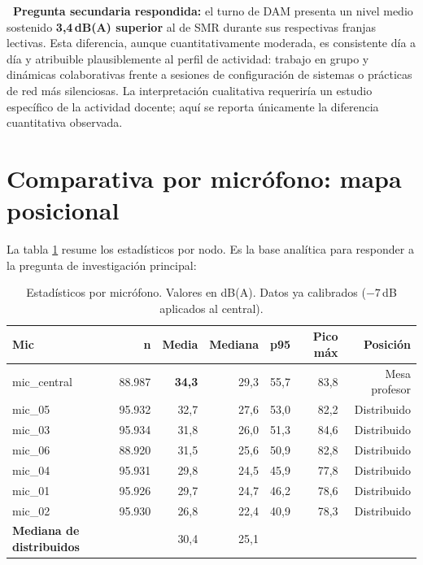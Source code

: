 \documentclass[11pt,a4paper,openany]{report}
\begin{document}
\begin{KeyFinding}
\textbf{\faLightbulb\ Pregunta secundaria respondida:} el turno de DAM presenta un nivel medio sostenido \textbf{3,4\,dB(A) superior} al de SMR durante sus respectivas franjas lectivas. Esta diferencia, aunque cuantitativamente moderada, es consistente d\'ia a d\'ia y atribuible plausiblemente al perfil de actividad: trabajo en grupo y din\'amicas colaborativas frente a sesiones de configuraci\'on de sistemas o pr\'acticas de red m\'as silenciosas. La interpretaci\'on cualitativa requerir\'ia un estudio espec\'ifico de la actividad docente; aqu\'i se reporta \'unicamente la diferencia cuantitativa observada.
\end{KeyFinding}

\section{Comparativa por micr\'ofono: mapa posicional}
\label{sec:res-mics}

La tabla \ref{tab:per-mic} resume los estad\'isticos por nodo. Es la base anal\'itica para responder a la pregunta de investigaci\'on principal:

\begin{table}[H]
\centering
{}
\begin{tabularx}{\textwidth}{l r r r r r r}
\toprule
\rowcolor{TableHead}
\textbf{Mic} & \textbf{n} & \textbf{Media} & \textbf{Mediana} & \textbf{p95} & \textbf{Pico m\'ax} & \textbf{Posici\'on} \\ \midrule
\rowcolor{CorpAccent!15}
mic\_central & 88.987 & \textbf{34,3} & 29,3 & 55,7 & 83,8 & Mesa profesor \\
mic\_05      & 95.932 & 32,7 & 27,6 & 53,0 & 82,2 & Distribuido \\
mic\_03      & 95.934 & 31,8 & 26,0 & 51,3 & 84,6 & Distribuido \\
mic\_06      & 88.920 & 31,5 & 25,6 & 50,9 & 82,8 & Distribuido \\
mic\_04      & 95.931 & 29,8 & 24,5 & 45,9 & 77,8 & Distribuido \\
mic\_01      & 95.926 & 29,7 & 24,7 & 46,2 & 78,6 & Distribuido \\
mic\_02      & 95.930 & 26,8 & 22,4 & 40,9 & 78,3 & Distribuido \\ \midrule
\textbf{Mediana de distribuidos} & & 30,4 & 25,1 & & & \\ \bottomrule
\end{tabularx}
\caption{Estad\'isticos por micr\'ofono. Valores en dB(A). Datos ya calibrados ($-7$\,dB aplicados al central).}
\label{tab:per-mic}
\end{table}
\end{document}
